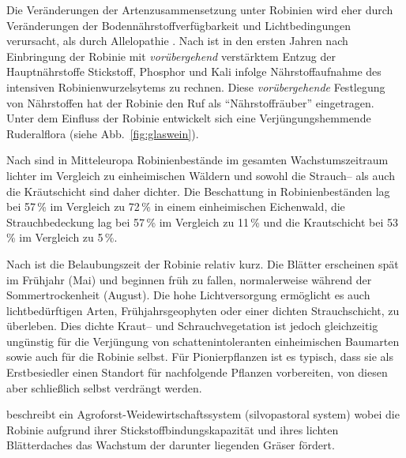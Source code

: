 \documentclass[twocolumn]{scrartcl}
\begin{document}
Die Veränderungen der Artenzusammensetzung unter Robinien wird eher durch
Veränderungen der Bodennährstoffverfügbarkeit und Lichtbedingungen
verursacht, als durch Allelopathie \citep{vitkova2017robinie}. Nach
\cite{mueller1991robinie} ist in den ersten Jahren nach Einbringung
der Robinie mit \emph{vorübergehend} verstärktem Entzug der Hauptnährstoffe
Stickstoff, Phosphor und Kali infolge Nährstoffaufnahme des intensiven
Robinienwurzelsytems zu rechnen. Diese \emph{vorübergehende} Festlegung von
Nährstoffen hat der Robinie den Ruf als \enquote{Nährstoffräuber}
eingetragen. Unter dem Einfluss der Robinie entwickelt sich eine
Verjüngungshemmende Ruderalflora (siehe Abb.~\ref{fig:glaswein}).

Nach \cite{hanzelka2015robinie} sind in Mitteleuropa Robinienbestände
im gesamten Wachstumszeitraum lichter im Vergleich zu einheimischen
Wäldern und sowohl die Strauch-- als auch die Kräutschicht sind daher
dichter. Die Beschattung in Robinienbeständen lag bei 57\,\% im
Vergleich zu 72\,\% in einem einheimischen Eichenwald, die
Strauchbedeckung lag bei 57\,\% im Vergleich zu 11\,\% und die
Krautschicht bei 53\,\% im Vergleich zu 5\,\%.

Nach \cite{vitkova2017robinie} ist die Belaubungszeit der Robinie
relativ kurz. Die Blätter erscheinen spät im Frühjahr (Mai) und
beginnen früh zu fallen, normalerweise während der Sommertrockenheit
(August). Die hohe Lichtversorgung ermöglicht es auch lichtbedürftigen
Arten, Frühjahrsgeophyten oder einer dichten Strauchschicht, zu
überleben. Dies dichte Kraut-- und Schrauchvegetation ist jedoch
gleichzeitig ungünstig für die Verjüngung von schattenintoleranten
einheimischen Baumarten sowie auch für die Robinie selbst. Für
Pionierpflanzen ist es typisch, dass sie als Erstbesiedler einen
Standort für nachfolgende Pflanzen vorbereiten, von diesen aber
schließlich selbst verdrängt werden.

\citet[p.\,467, 586]{ashton2018silviculture} beschreibt ein
Agroforst-Weidewirtschaftssystem (silvopastoral system) wobei die
Robinie aufgrund ihrer Stickstoffbindungskapazität und ihres lichten
Blätterdaches das Wachstum der darunter liegenden Gräser fördert.
\end{document}
